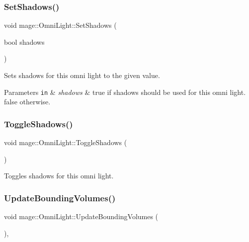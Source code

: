 \subsubsection{\texorpdfstring{Set\+Shadows()}{SetShadows()}}
{\footnotesize\ttfamily void mage\+::\+Omni\+Light\+::\+Set\+Shadows (\begin{DoxyParamCaption}\item[{bool}]{shadows }\end{DoxyParamCaption})\hspace{0.3cm}{\ttfamily [noexcept]}}

Sets shadows for this omni light to the given value.


\begin{DoxyParams}[1]{Parameters}
\mbox{\tt in}  & {\em shadows} & {\ttfamily true} if shadows should be used for this omni light. {\ttfamily false} otherwise. \\
\hline
\end{DoxyParams}
\hypertarget{classmage_1_1_omni_light_a19164a13e884bce6fbc80b760c82d243}{}\label{classmage_1_1_omni_light_a19164a13e884bce6fbc80b760c82d243} 
\subsubsection{\texorpdfstring{Toggle\+Shadows()}{ToggleShadows()}}
{\footnotesize\ttfamily void mage\+::\+Omni\+Light\+::\+Toggle\+Shadows (\begin{DoxyParamCaption}{ }\end{DoxyParamCaption})\hspace{0.3cm}{\ttfamily [noexcept]}}

Toggles shadows for this omni light. \hypertarget{classmage_1_1_omni_light_a6a10cdc0ed276d68e5378eaf934158e1}{}\label{classmage_1_1_omni_light_a6a10cdc0ed276d68e5378eaf934158e1} 
\subsubsection{\texorpdfstring{Update\+Bounding\+Volumes()}{UpdateBoundingVolumes()}}
{\footnotesize\ttfamily void mage\+::\+Omni\+Light\+::\+Update\+Bounding\+Volumes (\begin{DoxyParamCaption}{ }\end{DoxyParamCaption})\hspace{0.3cm}{\ttfamily [private]}, {\ttfamily [noexcept]}}

